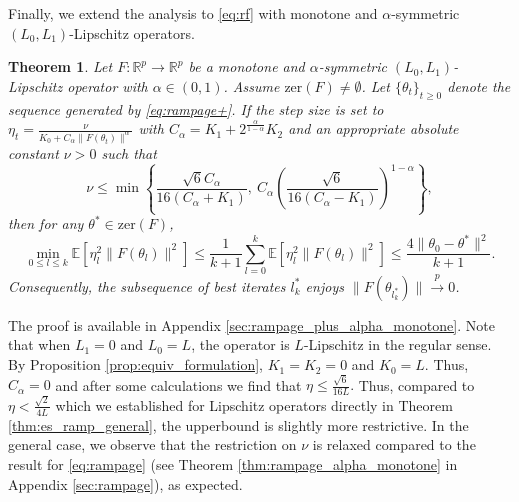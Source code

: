 \documentclass[letter,11pt]{article}
\newtheorem{theorem}{Theorem}[]
\begin{document}
Finally, we extend the analysis to \eqref{eq:rf} with monotone and $\alpha$-symmetric $(L_0, L_1)$-Lipschitz operators.
\begin{theorem} \label{thm:rampage_plus_alpha_monotone}
Let $F: \mathbb{R}^p \to \mathbb{R}^p$ be a monotone and $\alpha$-symmetric $(L_0, L_1)$-Lipschitz operator with $\alpha \in (0, 1)$. Assume $\mathrm{zer}(F) \neq \emptyset$. Let $\{\theta_t\}_{t \ge 0}$ denote the sequence generated by \eqref{eq:rampage+}. If the step size is set to $\eta_t = \frac{\nu}{K_0 + C_\alpha \|F(\theta_t)\|^\alpha}$ with $C_\alpha = K_1 + 2^{\frac{\alpha}{1-\alpha}} K_2$ and an appropriate absolute constant $\nu > 0$ such that
\begin{equation}
\nu \le \min \left\{ \frac{\sqrt{6} C_\alpha}{16(C_\alpha + K_1)}, \ C_\alpha \left( \frac{\sqrt{6}}{16(C_\alpha - K_1)} \right)^{1-\alpha} \right\},
\end{equation}
then for any $\theta^* \in \mathrm{zer}(F)$,
\begin{equation}
\min_{0 \le l \le k} \mathbb{E}\left[ \eta_l^2 \|F(\theta_l)\|^2 \right] \le \frac{1}{k+1} \sum_{l=0}^k \mathbb{E}\left[ \eta_l^2 \|F(\theta_l)\|^2 \right] \le \frac{4\|\theta_0 - \theta^*\|^2}{k+1}.
\end{equation}
Consequently, the subsequence of best iterates $l^\ast_k$ enjoys $\|F(\theta_{l^\ast_k})\| \xrightarrow{p} 0$.
\end{theorem}
The proof is available in Appendix \ref{sec:rampage_plus_alpha_monotone}. Note that when $L_1 = 0$ and $L_0 = L$, the operator is $L$-Lipschitz in the regular sense. By Proposition \ref{prop:equiv_formulation}, $K_1 = K_2 = 0$ and $K_0 =L$. Thus, $C_\alpha = 0$ and after some calculations we find that $\eta \le \frac{\sqrt{6}}{16 L}.$ Thus, compared to $\eta < \frac{\sqrt{2}}{4L}$ which we established for Lipschitz operators directly in Theorem \ref{thm:es_ramp_general}, the upperbound is slightly more restrictive. In the general case, we observe that the restriction on $\nu$ is relaxed compared to the result for \eqref{eq:rampage} (see Theorem \ref{thm:rampage_alpha_monotone} in Appendix \ref{sec:rampage}), as expected. 
\end{document}
